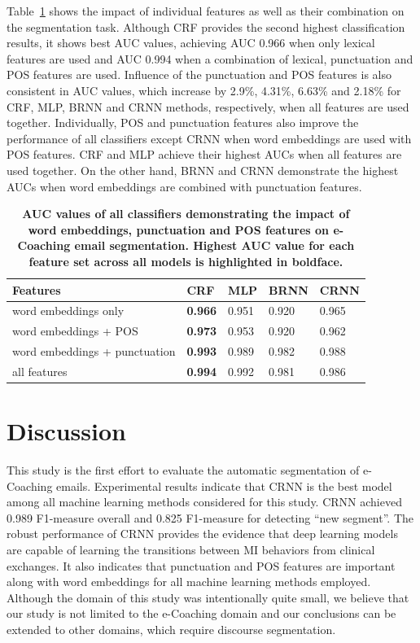 \documentclass{amia}
\begin{document}
Table~\ref{tab:result_roc} shows the impact of individual features as well as their combination on the segmentation task. Although CRF provides the second highest classification results, it shows best AUC values, achieving AUC 0.966 when only lexical features are used and AUC 0.994 when a combination of lexical, punctuation and POS features are used. Influence of the punctuation and POS features is also consistent in AUC values, which increase by 2.9\%, 4.31\%, 6.63\% and 2.18\% for CRF, MLP, BRNN and CRNN methods, respectively, when all features are used together. Individually, POS and punctuation features also improve the performance of all classifiers except CRNN when word embeddings are used with POS features. CRF and MLP achieve their highest AUCs when all features are used together. On the other hand, BRNN and CRNN demonstrate the highest AUCs when word embeddings are combined with punctuation features. \\

\begin{table}[ht]
\centering
\caption{\textbf{AUC values of all classifiers demonstrating the impact of word embeddings, punctuation and POS features on e-Coaching email segmentation. Highest AUC value for each feature set across all models is highlighted in boldface.}}
\label{tab:result_roc}
 \begin{tabular}{|l|l|l|l|l|}
  \hline
\textbf{Features} & \textbf{CRF} & \textbf{MLP}  & \textbf{BRNN} & \textbf{CRNN} \\ \hline      
 word embeddings only & \textbf{0.966} & 0.951 & 0.920 & 0.965 \\ \hline
 word embeddings + POS & \textbf{0.973} & 0.953 & 0.920 & 0.962 \\ \hline
 word embeddings + punctuation & \textbf{0.993} & 0.989 & 0.982 & 0.988 \\ \hline
 all features & \textbf{0.994} & 0.992 & 0.981 & 0.986 \\ \hline
  \end{tabular}
\end{table}     

\section*{Discussion}
This study is the first effort to evaluate the automatic segmentation of e-Coaching emails. Experimental results indicate that CRNN is the best model among all machine learning methods considered for this study. CRNN achieved 0.989 F1-measure overall and 0.825 F1-measure for detecting ``new segment''. The robust performance of CRNN provides the evidence that deep learning models are capable of learning the transitions between MI behaviors from clinical exchanges. It also indicates that punctuation and POS features are important along with word embeddings for all machine learning methods employed. Although the domain of this study was intentionally quite small, we believe that our study is not limited to the e-Coaching domain and our conclusions can be extended to other domains, which require discourse segmentation.
\end{document}
